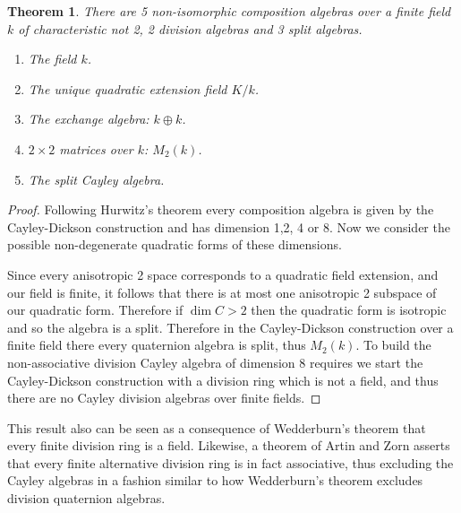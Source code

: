 \documentclass[12pt]{article}
\newtheorem{thm}{Theorem}
\begin{document}
\begin{thm}
There are 5 non-isomorphic composition algebras over a finite field $k$ of characteristic not 2, 
2 division algebras and 3 split algebras.
\begin{enumerate}
\item The field $k$.
\item The unique quadratic extension field $K/k$.
\item The \emph{exchange} algebra: $k\oplus k$.
\item $2\times 2$ matrices over $k$: $M_2(k)$.
\item The split Cayley algebra.
\end{enumerate}
\end{thm}
\begin{proof}
Following Hurwitz's theorem every composition algebra is given by the Cayley-Dickson construction
and has dimension 1,2, 4 or 8.  Now we consider the possible non-degenerate 
quadratic forms of these dimensions.

Since every anisotropic 2 space corresponds to a quadratic field extension, and our field is finite,
it follows that there is at most one anisotropic 2 subspace of our quadratic form.  Therefore
if $\dim C>2$ then the quadratic form is isotropic and so the algebra is a split.
Therefore in the Cayley-Dickson construction over a finite field there every quaternion 
algebra is split, thus $M_2(k)$.  To build the non-associative division Cayley algebra of dimension 8 requires 
we start the Cayley-Dickson construction with a division ring which is not a field, and thus there are no 
Cayley division algebras over finite fields.
\end{proof}

This result also can be seen as a consequence of Wedderburn's theorem that every finite division ring 
is a field.  
Likewise, a theorem of Artin and Zorn asserts that every finite alternative division ring is in fact associative,
thus excluding the Cayley algebras in a fashion similar to how Wedderburn's theorem excludes division
quaternion algebras.

\end{document}

